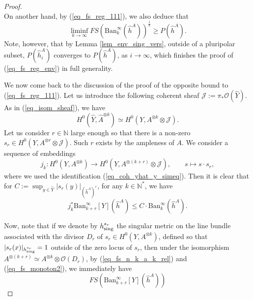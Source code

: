 \documentclass[12pt]{article}
\numberwithin{equation}{section}
\theoremstyle{theorem}
\theoremstyle{definition}
\theoremstyle{remark}
\newcommand{\nat}{\mathbb{N}}
\begin{document}
\begin{proof}
\begin{equation}
		 \end{equation}
		 On another hand, by (\ref{eq_fs_reg_111}), we also deduce that
		 \begin{equation}
		 	\liminf_{k \to \infty} FS({\textrm{Ban}}_k^{\infty}(\widehat{h}^A))^{\frac{1}{k}}
		 	\geq
		 	P(\widehat{h}^A).
		 \end{equation}
		 Note, however, that by Lemma \ref{lem_env_sing_vers}, outside of a pluripolar subset, $P(\widehat{h}^A_i)$ converges to $P(\widehat{h}^A)$, as $i \to \infty$, which finishes the proof of (\ref{eq_fs_reg_env}) in full generality.
		\par 
		We now come back to the discussion of the proof of the opposite bound to (\ref{eq_fs_reg_111}).
		Let us introduce the following coherent sheaf $\mathcal{J} := \pi_* \mathscr{O}(\widehat{Y})$.
		As in (\ref{eq_isom_sheaf}), we have 
		\begin{equation}\label{eq_coh_yhat_y_simeq}
			H^0(\widehat{Y}, \widehat{A}^{\otimes k}) \simeq H^0(Y, A^{\otimes k} \otimes \mathcal{J}).
		\end{equation}
		Let us consider $r \in \nat$ large enough so that there is a non-zero $s_r \in H^0(Y, A^{\otimes r} \otimes \mathcal{J})$.
		Such $r$ exists by the ampleness of $A$.
		We consider a sequence of embeddings
		\begin{equation}
			j_k: H^0(Y, A^{\otimes k})
			\to
			H^0(Y, A^{\otimes (k + r)} \otimes \mathcal{J}), \qquad s \mapsto s \cdot s_r,
		\end{equation}
		where we used the identification (\ref{eq_coh_yhat_y_simeq}).
		Then it is clear that for $C := \sup_{y \in \widehat{Y}} |s_r(y)|_{(\widehat{h}^A)^r}$, for any $k \in \nat^*$, we have
		\begin{equation}\label{eq_pull_back_jk_norm}
			j_k^* {\textrm{Ban}}_{k + r}^{\infty}[Y](\widehat{h}^A)
			\leq
			C 
			\cdot
			{\textrm{Ban}}_{k}^{\infty}(\widehat{h}^A).
		\end{equation}
		\par 
		Now, note that if we denote by $h^{s_r}_{\rm{sing}}$ the singular metric on the line bundle associated with the divisor $D_r$ of $s_r \in H^0(Y, A^{\otimes k})$, defined so that $|s_r(x)|_{h^{s_r}_{\rm{sing}}} = 1$ outside of the zero locus of $s_r$, then under the isomorphism $A^{\otimes (k + r)} \simeq A^{\otimes k} \otimes \mathscr{O}(D_r)$, by (\ref{eq_fs_n_k_a_k_rel}) and (\ref{eq_fs_monoton2}), we immediately have
		\begin{equation}\label{eq_fs_yhat_y_triv}
			FS({\textrm{Ban}}_{k + r}^{\infty}[Y](\widehat{h}^A))

\end{equation}
\end{proof}
\end{document}
